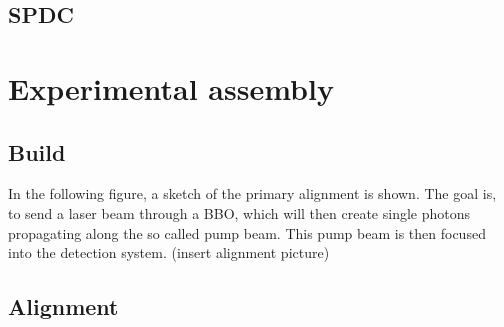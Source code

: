 \documentclass[12pt,a4paper]{article}
\begin{document}
\begin{multicols}{2}
\subsection{SPDC}
\label{SPDC}




\section{Experimental assembly}

\subsection{Build}
In the following figure, a sketch of the primary alignment is shown. The goal is, to send a laser beam through a BBO, which will then create single photons propagating along the so called pump beam. This pump beam is then focused into the detection system.
(insert alignment picture)

\subsection{Alignment}


\end{multicols}
\end{document}
